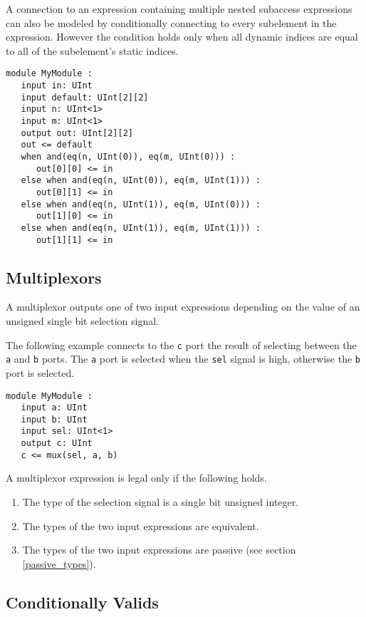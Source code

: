 \documentclass[12pt]{article}
\begin{document}
A connection to an expression containing multiple nested subaccess expressions can also be modeled by conditionally connecting to every subelement in the expression. However the condition holds only when all dynamic indices are equal to all of the subelement's static indices.
\begin{verbatim}
module MyModule :
   input in: UInt
   input default: UInt[2][2]
   input n: UInt<1>
   input m: UInt<1>
   output out: UInt[2][2]
   out <= default
   when and(eq(n, UInt(0)), eq(m, UInt(0))) :
      out[0][0] <= in
   else when and(eq(n, UInt(0)), eq(m, UInt(1))) :
      out[0][1] <= in
   else when and(eq(n, UInt(1)), eq(m, UInt(0))) :
      out[1][0] <= in
   else when and(eq(n, UInt(1)), eq(m, UInt(1))) :
      out[1][1] <= in                  
\end{verbatim}

\subsection{Multiplexors}\label{multiplexors}

A multiplexor outputs one of two input expressions depending on the value of an unsigned single bit selection signal. 

The following example connects to the \verb|c| port the result of selecting between the \verb|a| and \verb|b| ports. The \verb|a| port is selected when the \verb|sel| signal is high, otherwise the \verb|b| port is selected.
\begin{verbatim}
module MyModule :
   input a: UInt
   input b: UInt
   input sel: UInt<1>   
   output c: UInt
   c <= mux(sel, a, b)
\end{verbatim}

A multiplexor expression is legal only if the following holds.
\begin{enumerate}
\item The type of the selection signal is a single bit unsigned integer.
\item The types of the two input expressions are equivalent.
\item The types of the two input expressions are passive (see section \ref{passive_types}).
\end{enumerate}

\subsection{Conditionally Valids} \label{conditionally_valids}
\end{document}
